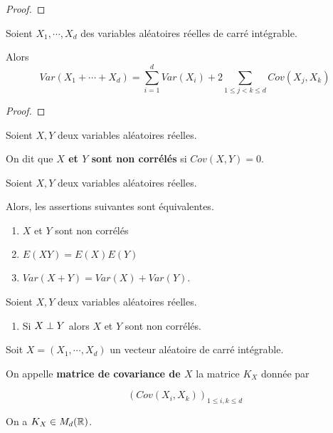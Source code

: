 \ifdefined\outputproof
\begin{proof}

\end{proof}
\fi

\begin{proposition}
	Soient $X_{1}, \cdots, X_{d}$ des variables aléatoires réelles de carré intégrable.

	Alors
	\begin{equation}
		Var(X_{1} + \cdots + X_{d}) = \sum_{i = 1}^{d} Var(X_{i}) + 2
		\sum_{1 \leq j < k \leq d} Cov(X_{j}, X_{k})
	\end{equation}
\end{proposition}

\ifdefined\outputproof
\begin{proof}

\end{proof}
\fi

\begin{definition}
	Soient $X, Y$ deux variables aléatoires réelles.

	On dit que \textbf{$X$ et $Y$ sont non corrélés} si $Cov(X, Y) = 0$.
\end{definition}

\begin{remarque}
	Soient $X, Y$ deux variables aléatoires réelles.

	Alors, les assertions suivantes sont équivalentes.

	\begin{enumerate}
		\item $X$ et $Y$ sont non corrélés
		\item $E(XY) = E(X) E(Y)$
		\item $Var(X + Y) = Var(X) + Var(Y)$.
	\end{enumerate}
\end{remarque}

\begin{remarque}
	Soient $X, Y$ deux variables aléatoires réelles.

	\begin{enumerate}
		\item Si $X \perp Y$ alors $X$ et $Y$ sont non corrélés.
	\end{enumerate}
\end{remarque}

\begin{definition}
	Soit $X = (X_{1}, \cdots, X_{d})$ un vecteur aléatoire de carré intégrable.

	On appelle \textbf{matrice de covariance de $X$} la matrice $K_{X}$ donnée
	par

	\begin{equation*}
		\left( Cov(X_{i}, X_{k}) \right)_{1 \leq i, k \leq d}
	\end{equation*}

	On a $K_{X} \in M_{d}(\mathbb{R})$.
\end{definition}

